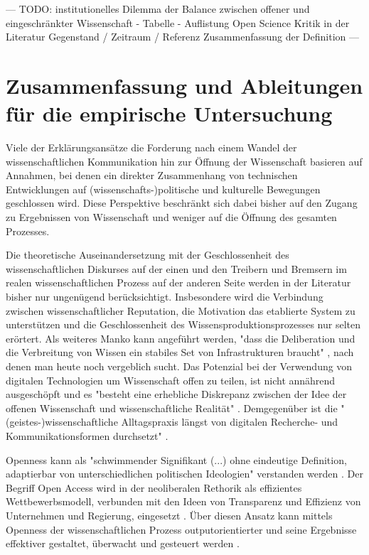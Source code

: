 --- TODO: institutionelles Dilemma der Balance zwischen offener und eingeschränkter Wissenschaft - Tabelle - Auflistung Open Science Kritik in der Literatur Gegenstand / Zeitraum / Referenz Zusammenfassung der Definition ---

\section{Zusammenfassung und Ableitungen für die empirische Untersuchung}

Viele der Erklärungsansätze die Forderung nach einem Wandel der wissenschaftlichen Kommunikation hin zur Öffnung der Wissenschaft basieren auf Annahmen, bei denen ein direkter Zusammenhang von technischen Entwicklungen auf (wissenschafts-)politische und kulturelle Bewegungen geschlossen wird. Diese Perspektive beschränkt sich dabei bisher auf den Zugang zu Ergebnissen von Wissenschaft und weniger auf die Öffnung des gesamten Prozesses.

Die theoretische Auseinandersetzung mit der Geschlossenheit des wissenschaftlichen Diskurses auf der einen und den Treibern und Bremsern im realen wissenschaftlichen Prozess auf der anderen Seite werden in der Literatur bisher nur ungenügend berücksichtigt. Insbesondere wird die Verbindung zwischen wissenschaftlicher Reputation, die Motivation das etablierte System zu unterstützen und die Geschlossenheit des Wissensproduktionsprozesses nur selten erörtert. Als weiteres Manko kann angeführt werden, "dass die Deliberation und die Verbreitung von Wissen ein stabiles Set von Infrastrukturen braucht" \cite{kelty_2004}, nach denen man heute noch vergeblich sucht. Das Potenzial bei der Verwendung von digitalen Technologien um Wissenschaft offen zu teilen, ist nicht annährend ausgeschöpft und es "besteht eine erhebliche Diskrepanz zwischen der Idee der offenen Wissenschaft und wissenschaftliche Realität" \cite{Scheliga_2014}. Demgegenüber ist die "(geistes-)wissenschaftliche Alltagspraxis längst von digitalen Recherche- und Kommunikationsformen durchsetzt" \cite{hagner_2015_sache_buches}.

Openness kann als "schwimmender Signifikant (...) ohne eindeutige Definition, adaptierbar von unterschiedlichen politischen Ideologien" verstanden werden \cite{Adema_2014_open_access}. Der Begriff Open Access wird in der neoliberalen Rethorik als effizientes Wettbewerbsmodell, verbunden mit den Ideen von Transparenz und Effizienz von Unternehmen und Regierung, eingesetzt \cite{tkacz_2012_open}. Über diesen Ansatz kann mittels Openness der wissenschaftlichen Prozess outputorientierter und seine Ergebnisse effektiver gestaltet, überwacht und gesteuert werden \cite{adema_2010_oaoverview}.

